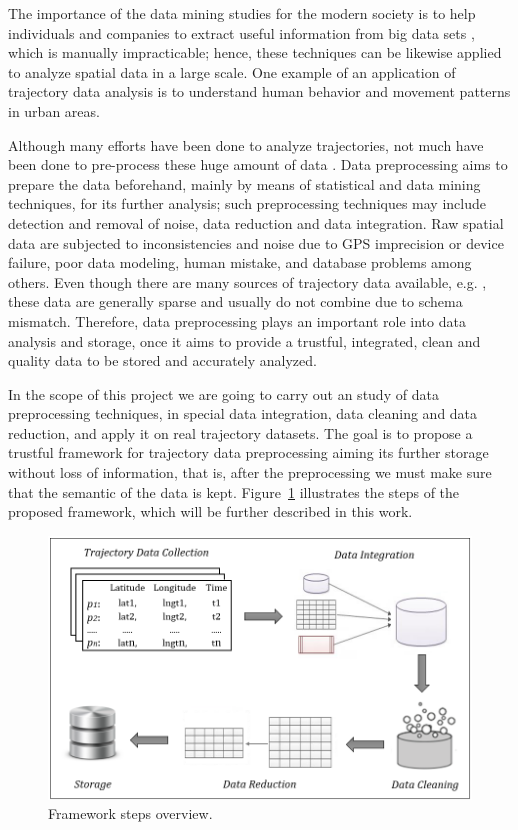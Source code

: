 \documentclass[a4paper,12pt]{article}
\begin{document}
The importance of the data mining studies for the modern society is to help individuals and companies to extract useful information from big data sets \cite{han2011}\cite{rajaraman2012}, which is manually impracticable; hence, these techniques can be likewise applied to analyze spatial data in a large scale. One example of an application of trajectory data analysis is to understand human behavior and movement patterns in urban areas.

Although many efforts have been done to analyze trajectories, not much have been done to pre-process these huge amount of data \cite{alvares2009}\cite{idrissov2012}. Data preprocessing aims to prepare the data beforehand, mainly by means of statistical and data mining techniques, for its further analysis; such preprocessing techniques may include detection and removal of noise, data reduction and data integration. Raw spatial data are subjected to inconsistencies and noise due to GPS imprecision or device failure, poor data modeling, human mistake, and database problems among others. Even though there are many sources of trajectory data available, e.g. \cite{nokia2012}\cite{yuan2010}\cite{zheng2010}, these data are generally sparse and usually do not combine due to schema mismatch. Therefore, data preprocessing plays an important role into data analysis and storage, once it aims to provide a trustful, integrated, clean and quality data to be stored and accurately analyzed.

In the scope of this project we are going to carry out an study of data preprocessing techniques, in special data integration, data cleaning and data reduction, and apply it on real trajectory datasets. The goal is to propose a trustful framework for trajectory data preprocessing aiming its further storage without loss of information, that is, after the preprocessing we must make sure that the semantic of the data is kept. Figure~\ref{fig:fig1} illustrates the steps of the proposed framework, which will be further described in this work.

\begin{figure}[htb]
\centering
\includegraphics[width=1\textwidth]{overview}
\caption{Framework steps overview.}
\label{fig:fig1}
\end{figure}
\end{document}
